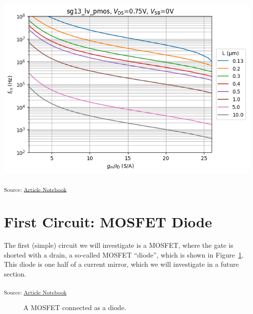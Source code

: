 \documentclass[
  a4paper,
  DIV=11,
  numbers=noendperiod]{scrartcl}
\begin{document}
\includegraphics{index_files/figure-latex/.-sizing-techsweep_sg13_plots_pmos-cell-14-output-1.png}

\textsubscript{Source:
\href{https://iic-jku.github.io/analog-circuit-design/index.qmd.html}{Article
Notebook}}

\section{First Circuit: MOSFET Diode}\label{sec-mosfet-diode}

The first (simple) circuit we will investigate is a MOSFET, where the
gate is shorted with a drain, a so-called MOSFET ``diode'', which is
shown in Figure~\ref{fig-mosfet-diode}. This diode is one half of a
current mirror, which we will investigate in a future section.

\textsubscript{Source:
\href{https://iic-jku.github.io/analog-circuit-design/index.qmd.html}{Article
Notebook}}

\begin{figure}[H]


\caption{\label{fig-mosfet-diode}A MOSFET connected as a diode.}

\end{figure}%
\end{document}
